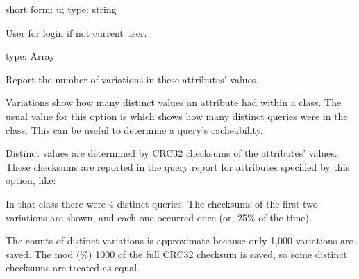 \documentclass[letterpaper,10pt,english]{sphinxmanual}
\begin{document}
\begin{fulllineitems}
\label{\detokenize{mariadb-query-digest:cmdoption-mariadb-query-digest-user}}
short form: \sphinxhyphen{}u; type: string

User for login if not current user.

\end{fulllineitems}


\begin{fulllineitems}
\label{\detokenize{mariadb-query-digest:cmdoption-mariadb-query-digest-variations}}
type: Array

Report the number of variations in these attributes’ values.

Variations show how many distinct values an attribute had within a class.
The usual value for this option is  which shows how many distinct queries
were in the class.  This can be useful to determine a query’s cacheability.

Distinct values are determined by CRC32 checksums of the attributes’ values.
These checksums are reported in the query report for attributes specified by
this option, like:

\begin{sphinxVerbatim}[commandchars=\\\{\}]
\end{sphinxVerbatim}

In that class there were 4 distinct queries.  The checksums of the first two
variations are shown, and each one occurred once (or, 25\% of the time).

The counts of distinct variations is approximate because only 1,000 variations
are saved.  The mod (\%) 1000 of the full CRC32 checksum is saved, so some
distinct checksums are treated as equal.

\end{fulllineitems}
\end{document}

